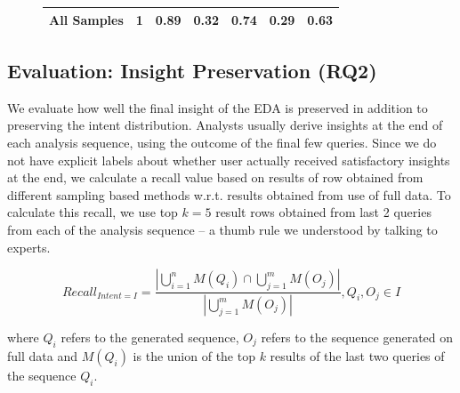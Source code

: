 \begin{figure}[t!]
\begin{minipage}[t]{0.49\textwidth}
{\begin{tabular}{|l|l|l|llll|}
All Samples                                                               & 1                                                                            & 0.89                                                                         & \multicolumn{1}{l|}{0.32}     & \multicolumn{1}{l|}{\textbf{0.74}}     & \multicolumn{1}{l|}{0.29}     & 0.63     \\ \hline
\end{tabular}
}
\label{tab:sample_results}
\end{minipage}
\vspace{-0.8em}
\end{figure}


\vspace{-0.2em}
\subsection{Evaluation: Insight Preservation (RQ2)}
\label{sec:eval_insight}
\vspace{-0.2em}

We evaluate how well the final insight of the EDA is preserved in addition to preserving the intent distribution.
Analysts usually derive insights at the end of each analysis sequence, using the outcome of the final few queries.
Since we do not have explicit labels about whether user actually received satisfactory insights at the end, we calculate a recall value based on results of row obtained from
different sampling based methods w.r.t. results obtained from use of full data.
To calculate this recall, we use top $k=5$ result rows obtained from last 2 queries from each of the analysis sequence -- a thumb rule we understood by talking to experts.

{\footnotesize
\begin{equation}
\label{recall_equation}
    Recall_{Intent=I} = \frac{|\bigcup_{i=1}^{n}M(Q_{i}) \cap \bigcup_{j=1}^{m}M(O_{j})|}{|\bigcup_{j=1}^{m}M(O_{j})|} , {Q_{i},O_{j}} \in I
\end{equation}
}

where $Q_i$ refers to the generated sequence, $O_j$ refers to the sequence generated on full data and $M(Q_i)$ is the union of the top $k$ results of the last two queries of the sequence $Q_i$.

